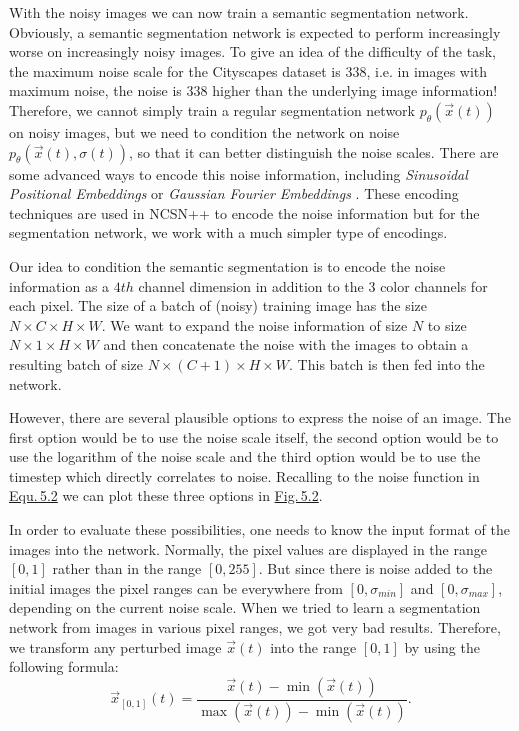 With the noisy images we can now train a semantic segmentation network. Obviously, a semantic segmentation network is expected to perform increasingly worse on increasingly noisy images. To give an idea of the difficulty of the task, the maximum noise scale for the Cityscapes dataset is $338$, i.e. in images with maximum noise, the noise is $338$ higher than the underlying image information! Therefore, we cannot simply train a regular segmentation network $p_\theta(\vec{x}(t))$ on noisy images, but we need to condition the network on noise $p_\theta(\vec{x}(t), \sigma(t))$, so that it can better distinguish the noise scales. There are some advanced ways to encode this noise information, including \textit{Sinusoidal Positional Embeddings} \cite{attention} or \textit{Gaussian Fourier Embeddings} \cite{fourfeat}. These encoding techniques are used in NCSN++ to encode the noise information but for the segmentation network, we work with a much simpler type of encodings.

Our idea to condition the semantic segmentation is to encode the noise information as a $4th$ channel dimension in addition to the $3$ color channels for each pixel. The size of a batch of (noisy) training image has the size $N\times C\times H\times W$. We want to expand the noise information of size $N$ to size $N\times 1\times H\times W$ and then concatenate the noise with the images to obtain a resulting batch of size $N\times (C+1)\times H\times W$. This batch is then fed into the network.

However, there are several plausible options to express the noise of an image. The first option would be to use the noise scale itself, the second option would be to use the logarithm of the noise scale and the third option would be to use the timestep which directly correlates to noise. Recalling to the noise function in \hyperref[equ:5.2]{Equ.\,5.2} we can plot these three options in \hyperref[fig:5.2]{Fig.\,5.2}.

In order to evaluate these possibilities, one needs to know the input format of the images into the network. Normally, the pixel values are displayed in the range $[0, 1]$ rather than in the range $[0, 255]$. But since there is noise added to the initial images the pixel ranges can be everywhere from $[0,\sigma_{min}]$ and $[0, \sigma_{max}]$, depending on the current noise scale. When we tried to learn a segmentation network from images in various pixel ranges, we got very bad results. Therefore, we transform any perturbed image $\vec{x}(t)$ into the range $[0, 1]$ by using the following formula:
%
\begin{equation}
    \vec{x}_{[0,1]}(t)=\frac{\vec{x}(t)-\min(\vec{x}(t))}{\max(\vec{x}(t))-\min(\vec{x}(t))}.
\end{equation}
%

